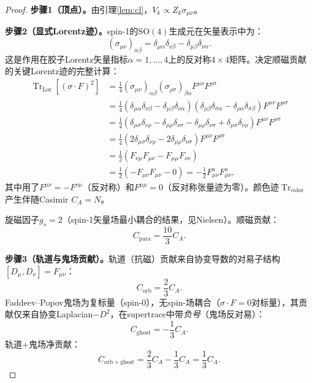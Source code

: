 \documentclass[12pt,a4paper]{article}
\theoremstyle{plain}
\theoremstyle{definition}
\theoremstyle{remark}
\begin{document}
\begin{proof}
\textbf{步骤1（顶点）。}由引理\ref{lem:cl}，$V_k\propto Z_k\sigma_{\mu\nu}$。

\textbf{步骤2（显式Lorentz迹）。}spin-1的$\mathrm{SO}(4)$生成元在矢量表示中为：
\begin{equation}\label{eq:sigma}
(\sigma_{\mu\nu})_{\alpha\beta}=\delta_{\mu\alpha}\delta_{\nu\beta}-\delta_{\mu\beta}\delta_{\nu\alpha}.
\end{equation}
这是作用在胶子Lorentz矢量指标$\alpha=1,\ldots,4$上的反对称$4\times 4$矩阵。决定顺磁贡献的关键Lorentz迹的完整计算：
\begin{align}
\operatorname{Tr}_{\mathrm{Lor}}[(\sigma\cdot F)^2]
&= \tfrac{1}{4}(\sigma_{\mu\nu})_{\alpha\beta}(\sigma_{\rho\sigma})_{\beta\alpha}F^{\mu\nu}F^{\rho\sigma}\label{eq:lt1}\\
&= \tfrac{1}{4}(\delta_{\mu\alpha}\delta_{\nu\beta}-\delta_{\mu\beta}\delta_{\nu\alpha})(\delta_{\rho\beta}\delta_{\sigma\alpha}-\delta_{\rho\alpha}\delta_{\sigma\beta})F^{\mu\nu}F^{\rho\sigma}\label{eq:lt2}\\
&= \tfrac{1}{4}(\delta_{\mu\sigma}\delta_{\nu\rho}-\delta_{\mu\rho}\delta_{\nu\sigma}-\delta_{\mu\rho}\delta_{\nu\sigma}+\delta_{\mu\sigma}\delta_{\nu\rho})F^{\mu\nu}F^{\rho\sigma}\label{eq:lt3}\\
&= \tfrac{1}{4}(2\delta_{\mu\sigma}\delta_{\nu\rho}-2\delta_{\mu\rho}\delta_{\nu\sigma})F^{\mu\nu}F^{\rho\sigma}\label{eq:lt4}\\
&= \tfrac{1}{2}(F_{\nu\mu}F_{\mu\nu}-F_{\mu\mu}F_{\nu\nu})\label{eq:lt5}\\
&= \tfrac{1}{2}(-F_{\mu\nu}F_{\mu\nu}-0) = -\tfrac{1}{2}F_{\mu\nu}^aF_{\mu\nu}^a,\label{eq:lt6}
\end{align}
其中用了$F^{\mu\nu}=-F^{\nu\mu}$（反对称）和$F^{\mu\mu}=0$（反对称张量迹为零）。颜色迹$\operatorname{Tr}_{\mathrm{color}}$产生伴随Casimir $C_A=N$。

旋磁因子$g_s=2$（spin-1矢量场最小耦合的结果，见Nielsen\cite{Nielsen1981}）。顺磁贡献：
\begin{equation}\label{eq:Cpara}
C_{\mathrm{para}} = \frac{10}{3}C_A.
\end{equation}

\textbf{步骤3（轨道与鬼场贡献）。}轨道（抗磁）贡献来自协变导数的对易子结构$[D_\mu,D_\nu]=F_{\mu\nu}$：
\begin{equation}
C_{\mathrm{orb}} = \frac{2}{3}C_A.
\end{equation}
Faddeev--Popov鬼场为复标量（spin-0），无spin-场耦合（$\sigma\cdot F=0$对标量），其贡献仅来自协变Laplacian$-D^2$，在supertrace中带\emph{负号}（鬼场反对易）：
\begin{equation}
C_{\mathrm{ghost}} = -\frac{1}{3}C_A.
\end{equation}
轨道$+$鬼场净贡献：
\begin{equation}\label{eq:Corbghost}
C_{\mathrm{orb+ghost}} = \frac{2}{3}C_A - \frac{1}{3}C_A = \frac{1}{3}C_A.
\end{equation}


\end{proof}
\end{document}
